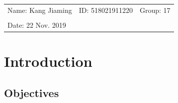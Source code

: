 \documentclass{article}
\begin{document}
\vspace*{0.25cm}

\noindent\hrulefill

\thispagestyle{empty}

\begin{center}
    \begin{large}
    \end{large}

    \hrulefill

    \vspace*{5cm}
    \begin{Large}
    \end{Large}

    \vspace{2em}

    \begin{large}
    \end{large}
\end{center}
\vfill

\begin{table}[h!]
    \flushleft
    \begin{tabular}{lll}
        Name: Kang Jiaming \hspace*{2em} &
        ID: 518021911220\hspace*{2em}
                                         & Group: 17 \\

        \\

        Date: 22 Nov. 2019
    \end{tabular}
\end{table}

\hfill
\newpage
\tableofcontents
\setcounter{page}{0}
\thispagestyle{empty}
\newpage

\section{Introduction}

\subsection{Objectives}
\end{document}
